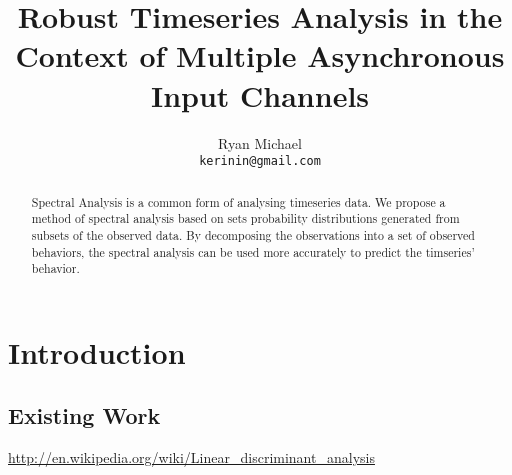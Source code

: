 \documentclass[10pt]{article}
\begin{document}
\title{Robust Timeseries Analysis in the Context of Multiple Asynchronous Input Channels}
\author{Ryan Michael\\ \texttt{kerinin@gmail.com}}
\maketitle

\begin{abstract}
Spectral Analysis is a common form of analysing timeseries data.  We propose a method of spectral analysis based on sets probability distributions generated from subsets of the observed data.  By decomposing the observations into a set of observed behaviors, the spectral analysis can be used more accurately to predict the timseries' behavior.

\end{abstract}

\section{Introduction}

\subsection{Existing Work}

\url{http://en.wikipedia.org/wiki/Linear_discriminant_analysis}



\end{document}
